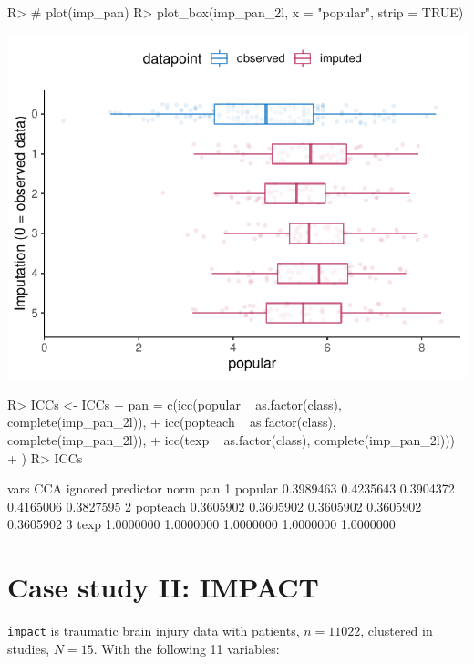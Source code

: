 \documentclass[
]{jss}
\begin{document}
\begin{CodeChunk}
\begin{CodeInput}
R> # plot(imp_pan)
R> plot_box(imp_pan_2l, x = "popular", strip = TRUE)
\end{CodeInput}


\begin{center}\includegraphics{Manuscript_files/figure-latex/pop_pan_eval-1} \end{center}

\begin{CodeInput}
R> ICCs <- ICCs %
+            pan = c(icc(popular ~ as.factor(class), complete(imp_pan_2l)), 
+                     icc(popteach ~ as.factor(class), complete(imp_pan_2l)), 
+                     icc(texp ~ as.factor(class), complete(imp_pan_2l)))
+            )
R> ICCs
\end{CodeInput}
\begin{CodeOutput}
      vars       CCA   ignored predictor      norm       pan
1  popular 0.3989463 0.4235643 0.3904372 0.4165006 0.3827595
2 popteach 0.3605902 0.3605902 0.3605902 0.3605902 0.3605902
3     texp 1.0000000 1.0000000 1.0000000 1.0000000 1.0000000
\end{CodeOutput}
\end{CodeChunk}

\hypertarget{case-study-ii-impact}{%
\section{Case study II: IMPACT}\label{case-study-ii-impact}}

\texttt{impact} is traumatic brain injury data with patients,
\(n = 11022\), clustered in studies, \(N = 15\). With the following 11
variables:
\end{document}

